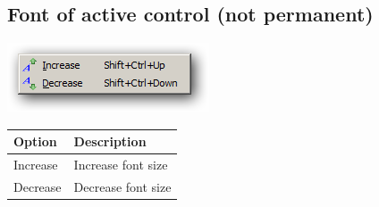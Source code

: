 \hypertarget{menu_view_fontsize}{}
\subsection{Font of active control (not permanent)}

\includegraphics[scale=0.50]{./res/menu_fontsize_generic.png}\\

\begin{scriptsize}\begin{tabularx}{\textwidth}{>{\hsize=0.3\hsize}X>{\hsize=0.7\hsize}X}\\
    \hline
    \textbf{Option} & \textbf{Description} \\
    \hline
    Increase & Increase font size \\
    Decrease & Decrease font size \\
    \hline
  \end{tabularx}\end{scriptsize}
